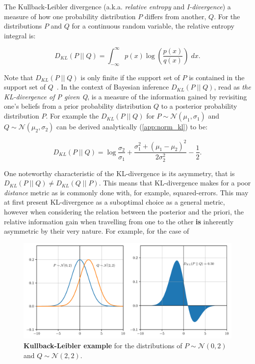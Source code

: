 The Kullback-Leibler divergence (a.k.a. \textit{relative entropy} and
\textit{I-divergence}) a measure of how one probability distribution $P$ differs
from another, $Q$. For the distributions $P$ and $Q$ for a continuous random
variable, the relative entropy integral is:

\begin{equation}
    D_{KL}(P\;||\;Q) = \int_{-\infty}^{\infty}p(x)\log(\frac{p(x)}{q(x)})\;dx.
    \label{eq:kullback-leibler}
\end{equation}

Note that $D_{KL}(P\;||\;Q)$ is only finite if the support set of $P$ is
contained in the support set of $Q$~\cite[p.~251]{Cover2006}. In the context
of Bayesian inference $D_{KL}(P\;||\;Q)$, read as \textit{the KL-divergence of P
given Q}, is a measure of the information gained by revisiting one's beliefs
from a prior probability distribution $Q$ to a posterior probability
distribution $P$. For example the $D_{KL}(P\;||\;Q)$ for
$P\sim{}\mathcal{N}(\mu_1,\sigma_1)$ and $Q\sim{}\mathcal{N}(\mu_2,\sigma_2)$ can be derived
analytically (\autoref{app:norm_kl}) to be:

\begin{equation}
    D_{KL}(P\;||\;Q) = \log\frac{\sigma_2}{\sigma_1} + \frac{\sigma_1^2 + (\mu_1-\mu_2)^2}{2\sigma_2^2} - \frac{1}{2}.
\end{equation}
%

One noteworthy characteristic of the KL-divergence is its asymmetry, that is
$D_{KL}(P\;||\;Q)\neq{}D_{KL}(Q\;||\;P)$. This means that KL-divergence makes
for a poor \textit{distance} metric as is commonly done with, for example,
squared-errors. This may at first present KL-divergence as a suboptimal choice
as a general metric, however when considering the relation between the posterior
and the priori, the relative information gain when travelling from one to the
other \textbf{is} inherently asymmetric by their very nature. For example, for
the case of

\begin{figure}[!htp]
    \centering
    \includegraphics[width=0.9\linewidth]{graphics/kullback-leibler.pdf}
    \caption{\textbf{Kullback-Leibler example} for the distributions of
    $P\sim{}\mathcal{N}(0,2)$ and $Q\sim{}\mathcal{N}(2,2)$. }
    \label{fig:kullback-leibler}
\end{figure}

